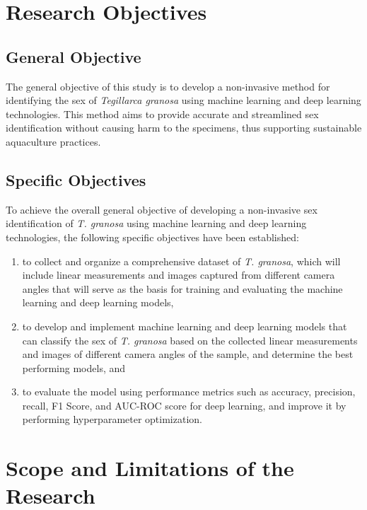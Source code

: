 \section{Research Objectives}
\label{sec:researchobjectives}

\subsection{General Objective}
\label{sec:generalobjective}

The general objective of this study is to develop a non-invasive method for identifying the sex of \textit{Tegillarca granosa} using machine learning and deep learning technologies. This method aims to provide accurate and streamlined sex identification without causing harm to the specimens, thus supporting sustainable aquaculture practices.

\subsection{Specific Objectives}
\label{sec:specificobjectives}

To achieve the overall general objective of developing a non-invasive sex identification of \textit{T. granosa} using machine learning and deep learning technologies, the following specific objectives have been established:  

\begin{enumerate}
	\item to collect and organize a comprehensive dataset of \textit{T. granosa}, which will include linear measurements and images captured from different camera angles that will serve as the basis for training and evaluating the machine learning and deep learning models,
	
	\item to develop and implement machine learning and deep learning models that can classify the sex of \textit{T. granosa} based on the collected linear measurements and images of different camera angles of the sample, and determine the best performing models, and
	
	\item to evaluate the model using performance metrics such as accuracy, precision, recall, F1 Score, and AUC-ROC score for deep learning, and improve it by performing hyperparameter optimization.
	
	
\end{enumerate}

\section{Scope and Limitations of the Research}
\label{sec:scopelimitations}

